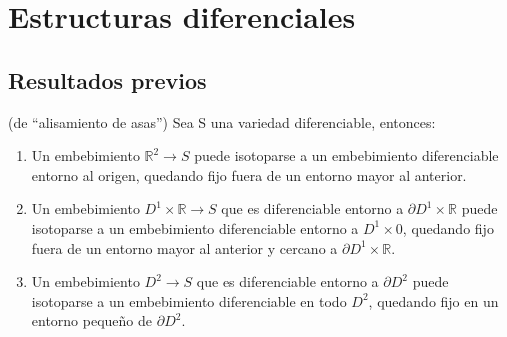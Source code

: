 
\chapter{Estructuras diferenciales}

\section{Resultados previos}

	\begin{teorema} (de ``alisamiento de asas'')
		Sea S una variedad diferenciable, entonces:
		\begin{enumerate}
			\item Un embebimiento $\mathbb{R}^2 \rightarrow S$ puede isotoparse a un embebimiento diferenciable entorno al origen, quedando fijo fuera de un entorno mayor al anterior.
			\item Un embebimiento $D^1\times\mathbb{R} \rightarrow S$ que es diferenciable entorno a $\partial D^1\times\mathbb{R}$ puede isotoparse a un embebimiento diferenciable entorno a $D^1\times 0$, quedando fijo fuera de un entorno mayor al anterior y cercano a $\partial D^1\times\mathbb{R}$.
			\item Un embebimiento $D^2 \rightarrow S$ que es diferenciable entorno a $\partial D^2$ puede isotoparse a un embebimiento diferenciable en todo $D^2$, quedando fijo en un entorno pequeño de $\partial D^2$.
		\end{enumerate}
	\end{teorema}

